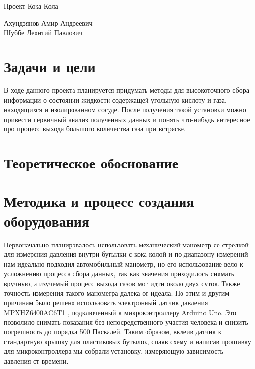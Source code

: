 \documentclass[12pt,a4paper]{scrartcl}
\begin{document}
\begin{center}
\begin{large}
Проект Кока-Кола
\end{large}
	\bigskip
     
Ахундзянов Амир Андреевич\\
Шуббе Леонтий Павлович
\end{center}

\section{Задачи и цели}
В ходе данного проекта планируется придумать методы для высокоточного сбора информации о состоянии жидкости  содержащей угольную кислоту и газа, находящихся и изолированном сосуде. После получения такой установки можно привести первичный анализ полученных данных и понять что-нибудь интересное про процесс выхода большого количества газа при встряске.

\section{Теоретическое обоснование}



\section{Методика и процесс создания оборудования}
Первоначально планировалось использовать механический манометр со стрелкой для измерения давления внутри бутылки с кока-колой и по диапазону измерений нам идеально подходил автомобильный манометр, но его использование вело к усложнению процесса сбора данных, так как значения приходилось снимать вручную, а изучемый процесс выхода газов мог идти около двух суток. Также точность измерения такого манометра далека от идеала. По этим и другим причинам было решено использовать электронный датчик давления MPXHZ6400AC6T1 , подключенный к микроконтроллеру Arduino Uno. Это позволило снимать показания без непосредственного участия человека и снизить погрешность до порядка 500 Паскалей. Таким образом, вклеив датчик в стандартную крышку для пластиковых бутылок, спаяв схему и написав прошивку для микроконтроллера мы собрали установку, измеряющую зависимость давления от времени.
\end{document}
